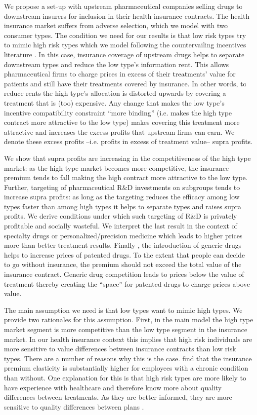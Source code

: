 \documentclass[a4paper,12pt]{article}
\begin{document}
We propose a set-up with upstream pharmaceutical companies selling drugs to downstream insurers for inclusion in their health insurance contracts. The health insurance market suffers from adverse selection, which we model with two consumer types. The condition we need for our results is that low risk types try to mimic high risk types which we model following the countervailing incentives literature \citep{LEWIS1989294}. In this case, insurance coverage of upstream drugs helps to separate downstream types and reduce the low type's information rent. This allows pharmaceutical firms to charge prices in excess of their treatments' value for patients and still have their treatments covered by insurance. In other words, to reduce rents the high type's allocation is distorted upwards by covering a treatment that is (too) expensive. Any change that makes the low type's incentive compatibility constraint ``more binding'' (i.e. makes the high type contract more attractive to the low type) makes covering this treatment more attractive and increases the excess profits that upstream firms can earn. We denote these excess profits --i.e. profits in excess of treatment value-- supra profits.

We show that supra profits are increasing in the competitiveness of the high type market: as the high type market becomes more competitive, the insurance premium tends to fall making the high contract more attractive to the low type. Further, targeting of pharmaceutical R\&D investments on subgroups tends to increase supra profits: as long as the targeting reduces the efficacy among low types faster than among high types it helps to separate types and raises supra profits. We derive conditions under which such targeting of R\&D is privately profitable and socially wasteful. We interpret the last result in the context of specialty drugs or personalized/precision medicine which leads to higher prices more than better treatment results. Finally , the introduction of generic drugs helps to increase prices of patented drugs. To the extent that people can decide to go without insurance, the premium should not exceed the total value of the insurance contract. Generic drug competition leads to prices below the value of treatment thereby creating the ``space'' for patented drugs to charge prices above value.

The main assumption we need is that low types want to mimic high types. We provide two rationales for this assumption. First, in the main model the high type market segment is more competitive than the low type segment in the insurance market. In our health insurance context this implies that high risk individuals are more sensitive to value differences between insurance contracts than low risk types. There are a number of reasons why this is the case. \cite{Parente2004} find that the insurance premium elasticity is substantially higher for employees with a chronic condition than without. One explanation for this is that high risk types are more likely to have experience with healthcare and therefore know more about quality differences between treatments. As they are better informed, they are more sensitive to quality differences between plans \citep{NBERw19800}.
\end{document}
